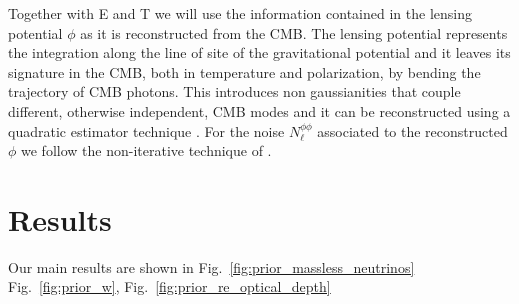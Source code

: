 \documentclass[aps,prd,reprint,superscriptaddress]{revtex4-1}
\newcommand{\reffig}[1]{Fig.~\ref{fig:#1}}
\begin{document}
Together with E and T we will use the information contained in the lensing potential $\phi$ as it is reconstructed from the CMB. The lensing potential represents the integration along the line of site of the gravitational potential and it leaves its signature in the CMB, both in temperature and polarization, by bending the trajectory of CMB photons. This introduces non gaussianities that couple different, otherwise independent, CMB modes and it can be reconstructed using a quadratic estimator technique \cite{okamoto:2003,hu:2002}.
For the noise $N_\ell^{\phi\phi}$ associated to the reconstructed $\phi$ we follow the non-iterative technique of \cite{okamoto:2003,hu:2002}.




%




\section{Results \label{sec:results}}
Our main results are shown in \reffig{prior_massless_neutrinos} \reffig{prior_w}, \reffig{prior_re_optical_depth}


%
%
%
\end{document}
